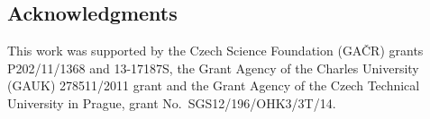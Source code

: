 \documentclass{itatnew}
\begin{document}
% 
% 
% 





\subsection*{Acknowledgments}

This work was supported by 
the Czech Science Foundation (GA\v{C}R) grants \hbox{P202/11/1368} and \hbox{13-17187S}, 
the Grant Agency of the Charles University (GAUK) \hbox{278511/2011} grant and 
the Grant Agency of the Czech Technical University in Prague, grant No.~\hbox{SGS12/196/OHK3/3T/14}.


%
%


% 
% 
% 
% 
% 
\end{document}
